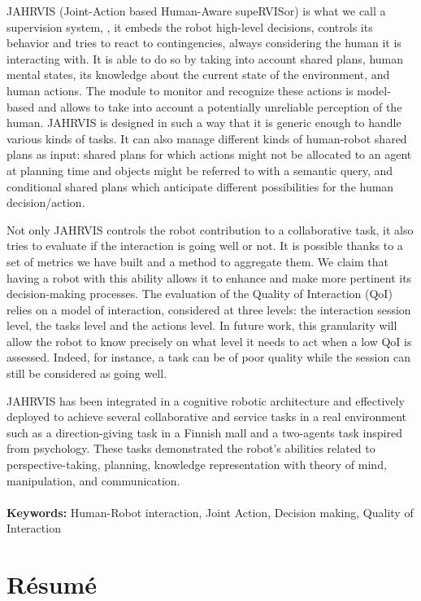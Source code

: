 \documentclass[english,a4paper,11pt,twoside]{StyleThese}
\begin{document}
JAHRVIS (Joint-Action based Human-Aware supeRVISor) is what we call a supervision system, \ie, it embeds the robot high-level decisions, controls its behavior and tries to react to contingencies, always considering the human it is interacting with. It is able to do so by taking into account shared plans, human mental states, its knowledge about the current state of the environment, and human actions. The module to monitor and recognize these actions is model-based and allows to take into account a potentially unreliable perception of the human. JAHRVIS is designed in such a way that it is generic enough to handle various kinds of tasks. It can also manage  different kinds of human-robot shared plans as input: shared plans for which actions might not be allocated to an agent at planning time and objects might be referred to with a semantic query, and conditional shared plans which anticipate different possibilities for the human decision/action. 


Not only JAHRVIS controls the robot contribution to a collaborative task, it also tries to evaluate if the interaction is going well or not. It is possible thanks to a set of metrics we have built and a method to aggregate them. We claim that having a robot with this ability allows it to enhance and make more pertinent its decision-making processes. The evaluation of the Quality of Interaction (QoI) relies on a model of interaction, considered at  three levels: the interaction session level, the tasks level and the actions level. In future work, this granularity will allow the robot to know precisely on what level it needs to act when a low QoI is assessed. Indeed, for instance, a task can be of poor quality while the session can still be considered as going well.


JAHRVIS has been integrated in a cognitive robotic architecture and effectively deployed to achieve several collaborative and service tasks in a real environment such as a direction-giving task in a Finnish mall and a two-agents task inspired from psychology. These tasks demonstrated the robot’s abilities related to perspective-taking, planning, knowledge representation with theory of mind, manipulation, and communication.
\\
\\
\textbf{Keywords:} Human-Robot interaction, Joint Action, Decision making, Quality of Interaction

\clearpage

\chapter*{Résumé}
\end{document}
